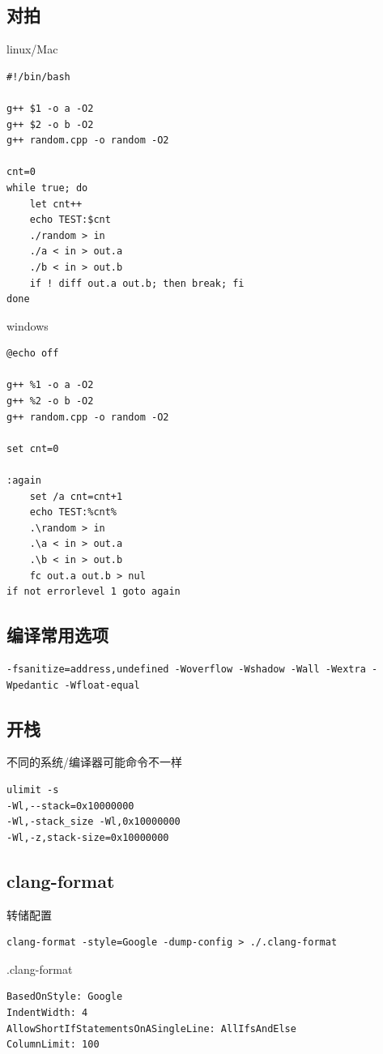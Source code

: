 \documentclass[UTF8, twoside]{ctexart}
\begin{document}
\begin{sloppypar}
\subsection{对拍}

linux/Mac

\begin{lstlisting}[style=cpp]
#!/bin/bash

g++ $1 -o a -O2
g++ $2 -o b -O2
g++ random.cpp -o random -O2

cnt=0
while true; do
    let cnt++
    echo TEST:$cnt
    ./random > in
    ./a < in > out.a
    ./b < in > out.b
    if ! diff out.a out.b; then break; fi
done
\end{lstlisting}

windows

\begin{lstlisting}[style=cpp]
@echo off

g++ %1 -o a -O2
g++ %2 -o b -O2
g++ random.cpp -o random -O2

set cnt=0

:again
    set /a cnt=cnt+1
    echo TEST:%cnt%
    .\random > in
    .\a < in > out.a
    .\b < in > out.b
    fc out.a out.b > nul
if not errorlevel 1 goto again
\end{lstlisting}

\subsection{编译常用选项}

\begin{lstlisting}[style=cpp]
-fsanitize=address,undefined -Woverflow -Wshadow -Wall -Wextra -Wpedantic -Wfloat-equal  
\end{lstlisting}

\subsection{开栈}

不同的系统/编译器可能命令不一样

\begin{lstlisting}[style=cpp]
ulimit -s
-Wl,--stack=0x10000000
-Wl,-stack_size -Wl,0x10000000
-Wl,-z,stack-size=0x10000000
\end{lstlisting}

\subsection{clang-format}

转储配置

\begin{lstlisting}[style=cpp]
clang-format -style=Google -dump-config > ./.clang-format
\end{lstlisting}

.clang-format

\begin{lstlisting}[style=cpp]
BasedOnStyle: Google
IndentWidth: 4
AllowShortIfStatementsOnASingleLine: AllIfsAndElse
ColumnLimit: 100
\end{lstlisting}

\end{sloppypar}
\end{document}
